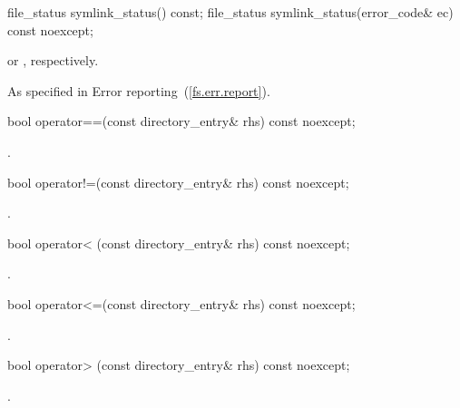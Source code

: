 \begin{itemdecl}
file_status  symlink_status() const;
file_status  symlink_status(error_code& ec) const noexcept;
\end{itemdecl}

\begin{itemdescr}
\pnum
\returns {} or , respectively.

\pnum
\throws As specified in Error reporting~(\ref{fs.err.report}).
\end{itemdescr}

\begin{itemdecl}
bool operator==(const directory_entry& rhs) const noexcept;
\end{itemdecl}

\begin{itemdescr}
\pnum
\returns {}.
\end{itemdescr}

\begin{itemdecl}
bool operator!=(const directory_entry& rhs) const noexcept;
\end{itemdecl}

\begin{itemdescr}
\pnum
\returns {}.
\end{itemdescr}

\begin{itemdecl}
bool operator< (const directory_entry& rhs) const noexcept;
\end{itemdecl}

\begin{itemdescr}
\pnum
\returns {}.
\end{itemdescr}

\begin{itemdecl}
bool operator<=(const directory_entry& rhs) const noexcept;
\end{itemdecl}

\begin{itemdescr}
\pnum
\returns {}.
\end{itemdescr}

\begin{itemdecl}
bool operator> (const directory_entry& rhs) const noexcept;
\end{itemdecl}

\begin{itemdescr}
\pnum
\returns {}.
\end{itemdescr}

